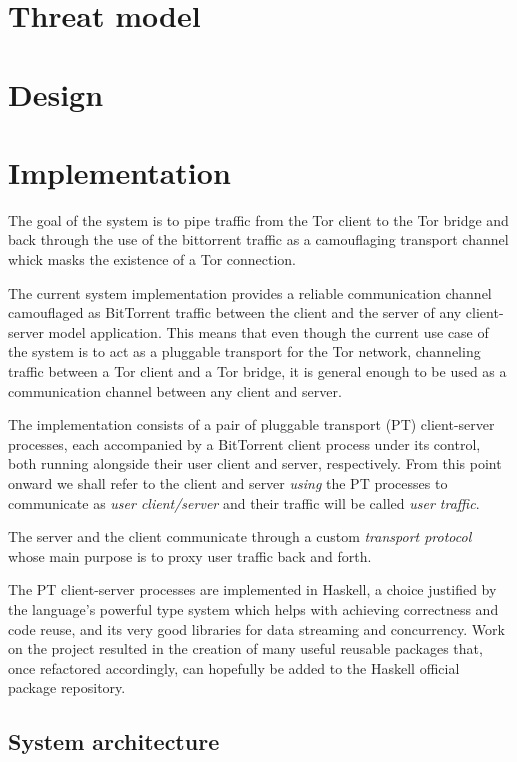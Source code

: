 \documentclass[11pt]{article} %
\begin{document}
\section{Threat model}

\section{Design}

\section{Implementation}

The goal of the system is to pipe traffic from the Tor client to the Tor bridge and back through the use of the bittorrent traffic as a camouflaging transport channel whick masks the existence of a Tor connection.

The current system implementation provides a reliable communication channel camouflaged as BitTorrent traffic between the client and the server of any client-server model application. This means that even though the current use case of the system is to act as a pluggable transport for the Tor network, channeling traffic between a Tor client and a Tor bridge, it is general enough to be used as a communication channel between any client and server.

The implementation consists of a pair of pluggable transport (PT) client-server processes, each accompanied by a BitTorrent client process under its control, both running alongside their user client and server, respectively. From this point onward we shall refer to the client and server \textit{using} the PT processes to communicate as \textit{user client/server} and their traffic will be called \textit{user traffic}. 

The server and the client communicate through a custom \textit{transport protocol} whose main purpose is to proxy user traffic back and forth. 

The PT client-server processes are implemented in Haskell, a choice justified by the language's powerful type system which helps with achieving correctness and code reuse, and its very good libraries for data streaming and concurrency. Work on the project resulted in the creation of many useful reusable packages that, once refactored accordingly, can hopefully be added to the Haskell official package repository.


\subsection{System architecture}
\end{document}
